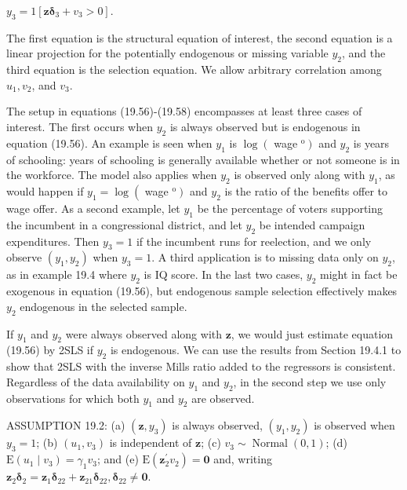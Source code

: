\documentclass[10pt]{article}
\begin{document}
$y_{3}=1\left[\mathbf{z} \boldsymbol{\delta}_{3}+v_{3}>0\right]$.

The first equation is the structural equation of interest, the second equation is a linear projection for the potentially endogenous or missing variable $y_{2}$, and the third equation is the selection equation. We allow arbitrary correlation among $u_{1}, v_{2}$, and $v_{3}$.

The setup in equations (19.56)-(19.58) encompasses at least three cases of interest. The first occurs when $y_{2}$ is always observed but is endogenous in equation (19.56). An example is seen when $y_{1}$ is $\log \left(\right.$ wage $\left.^{\mathrm{o}}\right)$ and $y_{2}$ is years of schooling: years of schooling is generally available whether or not someone is in the workforce. The model also applies when $y_{2}$ is observed only along with $y_{1}$, as would happen if $y_{1}= \log \left(\right.$ wage $\left.^{\mathrm{o}}\right)$ and $y_{2}$ is the ratio of the benefits offer to wage offer. As a second example, let $y_{1}$ be the percentage of voters supporting the incumbent in a congressional district, and let $y_{2}$ be intended campaign expenditures. Then $y_{3}=1$ if the incumbent runs for reelection, and we only observe $\left(y_{1}, y_{2}\right)$ when $y_{3}=1$. A third application is to missing data only on $y_{2}$, as in example 19.4 where $y_{2}$ is IQ score. In the last two cases, $y_{2}$ might in fact be exogenous in equation (19.56), but endogenous sample selection effectively makes $y_{2}$ endogenous in the selected sample.

If $y_{1}$ and $y_{2}$ were always observed along with $\mathbf{z}$, we would just estimate equation (19.56) by 2SLS if $y_{2}$ is endogenous. We can use the results from Section 19.4.1 to show that 2SLS with the inverse Mills ratio added to the regressors is consistent. Regardless of the data availability on $y_{1}$ and $y_{2}$, in the second step we use only observations for which both $y_{1}$ and $y_{2}$ are observed.

ASSUMPTION 19.2: (a) $\left(\mathbf{z}, y_{3}\right)$ is always observed, $\left(y_{1}, y_{2}\right)$ is observed when $y_{3}=1$; (b) $\left(u_{1}, v_{3}\right)$ is independent of $\mathbf{z}$; (c) $v_{3} \sim \operatorname{Normal}(0,1)$; (d) $\mathrm{E}\left(u_{1} \mid v_{3}\right)=\gamma_{1} v_{3}$; and (e) $\mathrm{E}\left(\mathbf{z}_{2}^{\prime} v_{2}\right)=\mathbf{0}$ and, writing $\mathbf{z}_{2} \boldsymbol{\delta}_{2}=\mathbf{z}_{1} \boldsymbol{\delta}_{22}+\mathbf{z}_{21} \boldsymbol{\delta}_{22}, \boldsymbol{\delta}_{22} \neq \mathbf{0}$.
\end{document}
